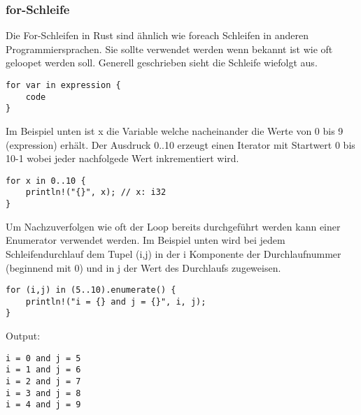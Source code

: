 \subsubsection{for-Schleife}
Die For-Schleifen in Rust sind ähnlich wie foreach Schleifen in anderen Programmiersprachen. Sie sollte verwendet werden wenn bekannt ist wie oft geloopet werden soll.
Generell geschrieben sieht die Schleife wiefolgt aus.
\begin{lstlisting}
for var in expression {
	code
}
\end{lstlisting}

Im Beispiel unten ist x die Variable welche nacheinander die Werte von 0 bis 9 (expression) erhält. Der Ausdruck 0..10 erzeugt einen Iterator mit Startwert 0 bis 10-1 wobei jeder nachfolgede Wert inkrementiert wird. 
\begin{lstlisting}
for x in 0..10 {
	println!("{}", x); // x: i32
}
\end{lstlisting}

Um Nachzuverfolgen wie oft der Loop bereits durchgeführt werden kann einer Enumerator verwendet werden. Im Beispiel unten wird bei jedem Schleifendurchlauf dem Tupel (i,j) in der i Komponente der Durchlaufnummer (beginnend mit 0) und in j der Wert des Durchlaufs zugeweisen.

\begin{lstlisting}
for (i,j) in (5..10).enumerate() {
	println!("i = {} and j = {}", i, j);
}
\end{lstlisting}
Output:
\begin{lstlisting}
i = 0 and j = 5
i = 1 and j = 6
i = 2 and j = 7
i = 3 and j = 8
i = 4 and j = 9
\end{lstlisting}